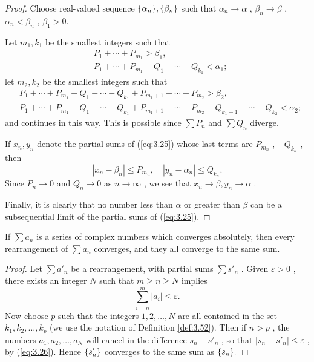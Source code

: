\begin{proof}
    Choose real-valued sequence $\protect\{\alpha_n\}, \protect\{\beta_n\}$ such that $\alpha_n \rightarrow \alpha$ , $\beta_n \rightarrow \beta$ ,
    $\alpha_n < \beta_n$ , $\beta_1 > 0$.
    
    Let $m_1, k_1$ be the smallest integers such that
    \begin{align*}
        &P_1 + \cdots + P_{m_1} > \beta_1,\\
        &P_1 + \cdots + P_{m_1} - Q_1 - \cdots - Q_{k_1} < \alpha_1;
    \end{align*}
    let $m_2, k_2$ be the smallest integers such that
    \begin{align*}
        &P_1 + \cdots + P_{m_1} - Q_1 - \cdots - Q_{k_1} + P_{m_1 + 1} + \cdots + P_{m_2} > \beta_2,\\
        &P_1 + \cdots + P_{m_1} - Q_1 - \cdots - Q_{k_1} + P_{m_1 + 1} + \cdots + P_{m_2} - Q_{k_1 + 1} - \cdots - Q_{k_2} < \alpha_2;
    \end{align*}
    and continues in this way. This is possible since 
    $\sum P_n$ and 
    $\sum Q_n$ diverge.

    If $x_n, y_n$ denote the partial sums of (\ref{eq:3.25}) whose last terms are $P_{m_n}$ , $-Q_{k_n}$ , then 
    \begin{equation*}
        \left| x_n - \beta_n \right| \leq P_{m_n}, \quad
        \left| y_n - \alpha_n \right| \leq Q_{k_n}.
    \end{equation*}
    Since $P_n \rightarrow 0$ and $Q_n \rightarrow 0$ as $n \rightarrow \infty$ , we see that $x_n \rightarrow \beta, y_n \rightarrow \alpha$ .

    Finally, it is clearly that no number less than $\alpha$ or greater than $\beta$ can be a subsequential limit of the partial sums of (\ref{eq:3.25}).
\end{proof}

\begin{thm}
    \label{thm:3.55}
    If $\sum a_n$ is a series of complex numbers which converges absolutely,
    then every rearrangement of $\sum a_n$ converges,
    and they all converge to the same sum.
\end{thm}

\begin{proof}
    Let $\sum a'_n$ be a rearrangement, with partial sums $\sum s'_n$ .
    Given $\varepsilon > 0$ ,
    there exists an integer $N$ such that $m \geq n \geq N$ implies
    \begin{equation}
        \label{eq:3.26}
        \sum_{i=n}^{m} \left| a_i \right| \leq \varepsilon.
    \end{equation}
    Now choose $p$ such that the integers $1,2,\dots,N$ are all contained in the set $k_1, k_2, \dots, k_p$ 
    (we use the notation of Definition \ref{def:3.52}).
    Then if $n>p$ , the numbers $a_1, a_2, \dots, a_N$ will cancel in the difference $s_n - s'_n$ , 
    so that $\left| s_n - s'_n \right| \leq \varepsilon$ , by (\ref{eq:3.26}).
    Hence $\protect\{s'_n\}$ converges to the same sum as $\protect\{s_n\}.$  
\end{proof}